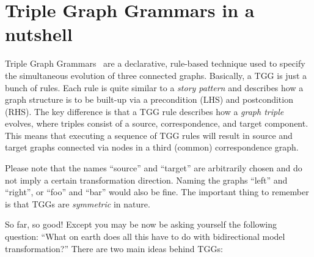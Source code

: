 \section{Triple Graph Grammars in a nutshell}
\label{sec:nutshell}
\genHeader

Triple Graph Grammars~\cite{tgg:schuerr_94,sk2008,Klar2010} are a declarative, rule-based technique used to specify the simultaneous evolution of three connected graphs. 
Basically, a TGG is just a bunch of rules. 
Each rule is quite similar to a \emph{story pattern} and describes how a graph structure is to be built-up
via a precondition (LHS) and postcondition (RHS). 
The key difference is that a TGG rule describes how a \emph{graph triple} evolves, where triples consist of a source, correspondence, and target component. 
This means that executing a sequence of TGG rules will result in source and target graphs connected via nodes in a third (common) correspondence graph.

\vspace{0.25cm}

Please note that the names ``source'' and ``target'' are arbitrarily chosen and do not imply a certain transformation direction. 
Naming the graphs ``left'' and ``right'', or ``foo'' and ``bar'' would also be fine. 
The important thing to remember is that TGGs are \emph{symmetric} in nature.

\vspace{0.25cm}

So far, so good! Except you may be now be asking yourself the following question: ``What on earth does all this have to do with bidirectional model transformation?'' 
There are two main ideas behind TGGs:

